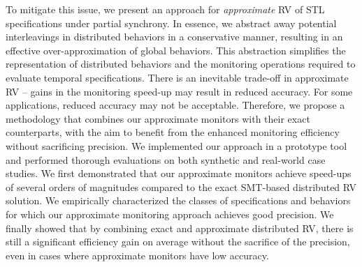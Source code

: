 To mitigate this issue, we present an approach for \emph{approximate} RV of STL specifications under partial synchrony. In essence, we abstract away potential interleavings in distributed behaviors in a conservative manner, resulting in an effective over-approximation of global behaviors. This abstraction simplifies the representation of distributed behaviors and the monitoring operations required to evaluate temporal specifications. There is an inevitable trade-off in approximate RV -- gains in the monitoring speed-up may result in reduced accuracy. For some applications, reduced accuracy may not be acceptable. Therefore, we propose a methodology that combines our approximate monitors with their exact counterparts, with the aim to benefit from the enhanced monitoring efficiency without sacrificing precision. We implemented our approach in a prototype tool and performed thorough evaluations on both synthetic and real-world case studies. We first demonstrated that our approximate monitors achieve speed-ups of several orders of magnitudes compared to the exact SMT-based distributed RV solution. We empirically characterized the classes of specifications and behaviors for which our approximate monitoring approach achieves good precision. We finally showed that by combining exact and approximate distributed RV, there is still a significant efficiency gain on average without the sacrifice of the precision, even in cases where approximate monitors have low accuracy.    